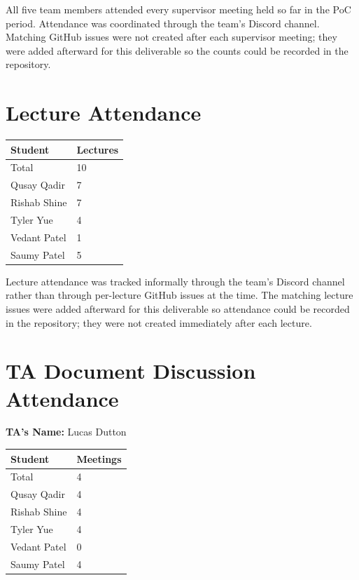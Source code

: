 \documentclass{article}
\begin{document}
All five team members attended every supervisor meeting held so far in the PoC
period. Attendance was coordinated through the team's Discord channel. Matching
GitHub issues were not created after each supervisor meeting; they were added
afterward for this deliverable so the counts could be recorded in the
repository.

\section{Lecture Attendance}

\begin{table}[H]
\centering
\begin{tabular}{ll}
\toprule
\textbf{Student} & \textbf{Lectures}\\
\midrule
Total & 10\\
Qusay Qadir & 7\\
Rishab Shine & 7\\
Tyler Yue & 4\\
Vedant Patel & 1\\
Saumy Patel & 5\\
\bottomrule
\end{tabular}
\end{table}

Lecture attendance was tracked informally through the team's Discord channel
rather than through per-lecture GitHub issues at the time. The matching lecture
issues were added afterward for this deliverable so attendance could be
recorded in the repository; they were not created immediately after each
lecture.

\section{TA Document Discussion Attendance}

\noindent \textbf{TA's Name: } Lucas Dutton

\begin{table}[H]
\centering
\begin{tabular}{ll}
\toprule
\textbf{Student} & \textbf{Meetings}\\
\midrule
Total & 4\\
Qusay Qadir & 4\\
Rishab Shine & 4\\
Tyler Yue & 4\\
Vedant Patel & 0\\
Saumy Patel & 4\\
\bottomrule
\end{tabular}
\end{table}
\end{document}
